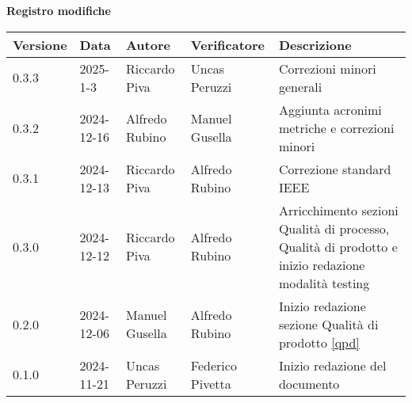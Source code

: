 \documentclass[11pt]{article}
\begin{document}
\begin{center}
\textbf{Registro modifiche}\\
\vspace{2mm}
\begin{tabularx}{\textwidth}{|l|l|l|l|X|}
\hline
\textbf{Versione} & \textbf{Data} & \textbf{Autore} & \textbf{Verificatore} & \textbf{Descrizione} \\
\hline
0.3.3 & 2025-1-3 & Riccardo Piva & Uncas Peruzzi & Correzioni minori generali \\
\hline
0.3.2 & 2024-12-16 & Alfredo Rubino & Manuel Gusella & Aggiunta acronimi metriche e correzioni minori\\
\hline
0.3.1 & 2024-12-13 & Riccardo Piva & Alfredo Rubino & Correzione standard IEEE \\
\hline
0.3.0 & 2024-12-12 & Riccardo Piva & Alfredo Rubino & Arricchimento sezioni Qualità di processo, Qualità di prodotto e inizio redazione modalità testing \\
\hline
0.2.0 & 2024-12-06 & Manuel Gusella  & Alfredo Rubino & Inizio redazione sezione Qualità di prodotto \ref{qpd}\\
\hline
0.1.0 & 2024-11-21 & Uncas Peruzzi  & Federico Pivetta & Inizio redazione del documento\\
\hline
\end{tabularx}
\end{center}
\newpage
\tableofcontents
\listoffigures %
\listoftables %
\newpage
\end{document}
